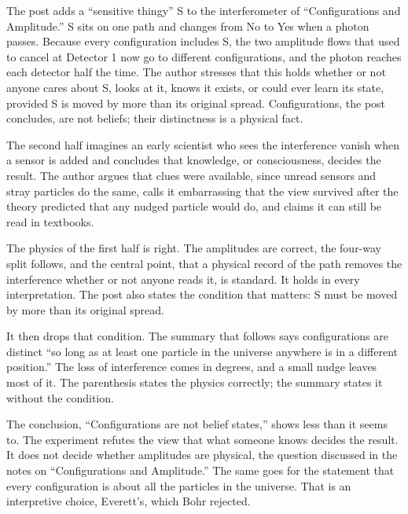 \begin{afterword}
\summaryhead

The post adds a ``sensitive thingy'' S to the interferometer of ``Configurations and Amplitude.'' S sits on one path and changes from No to Yes when a photon passes. Because every configuration includes S, the two amplitude flows that used to cancel at Detector 1 now go to different configurations, and the photon reaches each detector half the time. The author stresses that this holds whether or not anyone cares about S, looks at it, knows it exists, or could ever learn its state, provided S is moved by more than its original spread. Configurations, the post concludes, are not beliefs; their distinctness is a physical fact.

The second half imagines an early scientist who sees the interference vanish when a sensor is added and concludes that knowledge, or consciousness, decides the result. The author argues that clues were available, since unread sensors and stray particles do the same, calls it embarrassing that the view survived after the theory predicted that any nudged particle would do, and claims it can still be read in textbooks.

\responsehead

The physics of the first half is right. The amplitudes are correct, the four-way split follows, and the central point, that a physical record of the path removes the interference whether or not anyone reads it, is standard. It holds in every interpretation. The post also states the condition that matters: S must be moved by more than its original spread.

It then drops that condition. The summary that follows says configurations are distinct ``so long as at least one particle in the universe anywhere is in a different position.'' The loss of interference comes in degrees, and a small nudge leaves most of it. The parenthesis states the physics correctly; the summary states it without the condition.

The conclusion, ``Configurations are not belief states,'' shows less than it seems to. The experiment refutes the view that what someone knows decides the result. It does not decide whether amplitudes are physical, the question discussed in the notes on ``Configurations and Amplitude.'' The same goes for the statement that every configuration is about all the particles in the universe. That is an interpretive choice, Everett's, which Bohr rejected.


\end{afterword}

